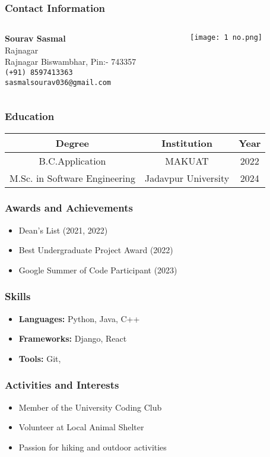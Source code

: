 \documentclass{beamer}
\begin{document}
\begin{frame}
    \frametitle{Contact Information}
    \begin{columns}
        \begin{column}{0.6\textwidth}
            \textbf{Sourav Sasmal} \\
            Rajnagar \\
            Rajnagar Biswambhar, Pin:- 743357 \\
            \texttt{(+91) 8597413363} \\
            \texttt{sasmalsourav036@gmail.com}
        \end{column}
        \begin{column}{0.4\textwidth}
            \texttt{[image: 1 no.png]}
        \end{column}
    \end{columns}
\end{frame}

\begin{frame}
    \frametitle{Education}
    \begin{table}[ht]
        \centering
        \begin{tabular}{|c|c|c|}
            \hline
            \textbf{Degree} & \textbf{Institution} & \textbf{Year} \\
            \hline
            B.C.Application & MAKUAT & 2022 \\
            \hline
            M.Sc. in Software Engineering & Jadavpur University & 2024 \\
            \hline
        \end{tabular}
    \end{table}
\end{frame}

\begin{frame}
    \frametitle{Awards and Achievements}
    \begin{itemize}
        \item Dean's List (2021, 2022)
        \item Best Undergraduate Project Award (2022)
        \item Google Summer of Code Participant (2023)
    \end{itemize}
\end{frame}

\begin{frame}
    \frametitle{Skills}
    \begin{itemize}
        \item \textbf{Languages:} Python, Java, C++
        \item \textbf{Frameworks:} Django, React
        \item \textbf{Tools:} Git,
    \end{itemize}
\end{frame}

\begin{frame}
    \frametitle{Activities and Interests}
    \begin{itemize}
        \item Member of the University Coding Club
        \item Volunteer at Local Animal Shelter
        \item Passion for hiking and outdoor activities
    \end{itemize}
\end{frame}
\end{document}
